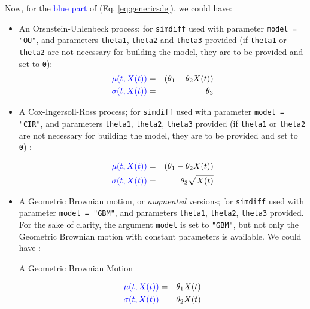\documentclass[a4paper]{article}\usepackage[]{graphicx}\usepackage[]{color}
\newcommand{\code}[1]{\mbox{\texttt{#1}}}
\begin{document}
\medskip

Now, for the \textcolor{blue}{blue part} of (Eq. \ref{eq:genericsde}), we could have: 

\begin{itemize}

\item An Orsnstein-Uhlenbeck process; for \code{simdiff} used with parameter \newline \code{model = "OU"}, and parameters \code{theta1}, \code{theta2} and \code{theta3} provided (if \code{theta1} or \code{theta2} are  not necessary for building the model, they are to be provided and set to \code{0}):
\begin{eqnarray*}
\textcolor{blue}{\mu(t, X(t))} &=& (\theta_1 - \theta_2 X(t))\\
\textcolor{blue}{\sigma(t, X(t))} &=& \theta_3\\
\end{eqnarray*}

\item A Cox-Ingersoll-Ross process; for \code{simdiff} used with parameter \newline \code{model = "CIR"}, and parameters \code{theta1}, \code{theta2}, \code{theta3} provided (if \code{theta1} or \code{theta2} are  not necessary for building the model, they are to be provided and set to \code{0}) : 

\begin{eqnarray*}
\textcolor{blue}{\mu(t, X(t))} &=& (\theta_1 - \theta_2 X(t))\\
\textcolor{blue}{\sigma(t, X(t))} &=& \theta_3 \sqrt{X(t)}\\
\end{eqnarray*} 

\item A Geometric Brownian motion, or \textit{augmented} versions; for \code{simdiff} used with parameter \code{model = "GBM"}, and parameters \code{theta1}, \code{theta2}, \code{theta3} provided. For the sake of clarity, the argument \code{model} is set to \code{"GBM"}, but not only the Geometric Brownian motion with constant parameters is available. We could have : 

A Geometric Brownian Motion

\begin{eqnarray*}
\textcolor{blue}{\mu(t, X(t))} &=& \theta_1 X(t)\\
\textcolor{blue}{\sigma(t, X(t))} &=& \theta_2 X(t)\\ 
\end{eqnarray*}


\end{itemize}
\end{document}
